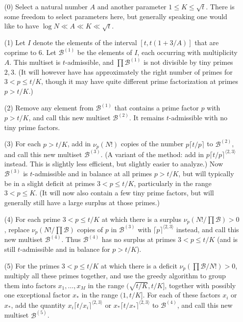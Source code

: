 \documentclass[12pt,a4paper,reqno]{amsart}
\numberwithin{equation}{section}
\theoremstyle{plain}
\theoremstyle{definition}
\newcommand\tuple{{\mathcal B}}
\begin{document}
\begin{enumerate}
\item[(0)] Select a natural number $A$ and another parameter $1 \leq K \leq \sqrt{t}$.  There is some freedom to select parameters here, but generally speaking one would like to have $\log N \ll A \ll K \ll \sqrt{t}$.
\item[(1)] Let $I$ denote the elements of the interval $[t,t(1+3/A)]$ that are coprime to $6$.  Let $\tuple^{(1)}$ be the elements of $I$, each occurring with multiplicity $A$.  This multiset is $t$-admissible, and $\prod \tuple^{(1)}$ is not divisible by tiny primes $2,3$.  (It will however have has approximately the right number of primes for $3 < p \leq t/K$, though it may have quite different prime factorization at primes $p>t/K$.)
\item[(2)] Remove any element from $\tuple^{(1)}$ that contains a prime factor $p$ with $p > t/K$, and call this new multiset $\tuple^{(2)}$.  It remains $t$-admissible with no tiny prime factors.
\item[(3)] For each $p > t/K$, add in $\nu_p(N!)$ copies of the number $p \lceil t/p \rceil$ to $\tuple^{(2)}$, and call this new multiset $\tuple^{(3)}$.  (A variant of the method: add in $p \lceil t/p \rceil^{\langle 2,3\rangle}$ instead. This is slightly less efficient, but slightly easier to analyze.)  Now $\tuple^{(3)}$ is $t$-admissible and in balance at all primes $p>t/K$, but will typically be in a slight deficit at primes $3 < p \leq t/K$, particularly in the range $3 < p \leq K$.  (It will now also contain a few tiny prime factors, but will generally still have a large surplus at those primes.)
\item[(4)] For each prime $3 < p \leq t/K$ at which there is a surplus $\nu_p(N!/\prod \tuple) > 0$, replace $\nu_p(N!/\prod \tuple)$ copies of $p$ in $\tuple^{(3)}$ with $\lceil p \rceil^{\langle 2,3 \rangle}$ instead, and call this new multiset $\tuple^{(4)}$.  Thus $\tuple^{(4)}$ has no surplus at primes $3 < p \leq t/K$ (and is still $t$-admissible and in balance for $p>t/K$).
\item [(5)]For the primes $3 < p \leq t/K$ at which there is a deficit $\nu_p(\prod \tuple/N!) > 0$, multiply all these primes together, and use the greedy algorithm to group them into factors $x_1, \dots, x_M$ in the range
$(\sqrt{t/K}, t/K]$, together with possibly one exceptional factor $x_*$ in the range $(1, t/K]$.  For each of these factors $x_i$ or $x_*$, add the quantity $x_i \lceil t/x_i \rceil^{\langle 2,3 \rangle}$ or $x_* \lceil t/x_* \rceil^{\langle 2,3 \rangle}$ to $\tuple^{(4)}$, and call this new multiset $\tuple^{(5)}$.  

\end{enumerate}
\end{document}
